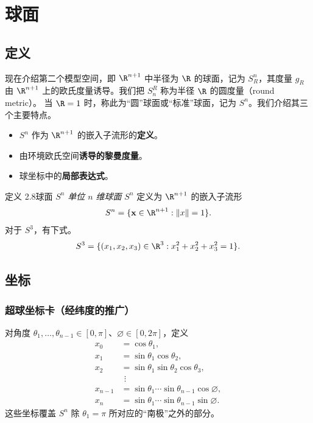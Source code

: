 \section{球面}
\subsection{定义}
现在介绍第二个模型空间，即 $\R^{n+1}$ 中半径为 $\R$ 的球面，记为 $S^n_R$，其度量 $g_R$ 由 $\R^{n+1}$ 上的欧氏度量诱导。我们把 $S_n^R$ 称为半径 $\R$ 的圆度量（round metric）。 当 $\R=1$ 时，称此为“圆”球面或“标准”球面，记为 $S^n$。我们介绍其三个主要特点。
\begin{itemize}
  \item $S^n$ 作为 $\R^{n+1}$ 的嵌入子流形的\textbf{定义}。
  \item 由环境欧氏空间\textbf{诱导的黎曼度量}。
  \item 球坐标中的\textbf{局部表达式}。
\end{itemize}

\begin{statement}{定义 2.8}{球面 $S^n$}
\emph{单位 $n$ 维球面} $S^n$ 定义为 $\R^{n+1}$ 的嵌入子流形
\[
  S^n=\{\mathbf x\in\R^{n+1}:\lVert x\rVert=1\}.
\]
对于 $S^3$，有下式。
\[
  S^3=\{(x_1,x_2,x_3)\in\R^3:x_1^2+x_2^2+x_3^2=1\}.
\]
\end{statement}

\subsection{坐标}
\subsubsection{超球坐标卡（经纬度的推广）}
对角度 $\theta_1,\ldots,\theta_{n-1}\in[0,\pi]$、$\varnothing\in[0,2\pi]$，定义
\[
  \begin{aligned}
    x_0&=\cos\theta_1,\\
    x_1&=\sin\theta_1\cos\theta_2,\\
    x_2&=\sin\theta_1\sin\theta_2\cos\theta_3,\\
    &\ \,\vdots\\
    x_{n-1}&=\sin\theta_1\cdots\sin\theta_{n-1}\cos\varnothing,\\
    x_n&=\sin\theta_1\cdots\sin\theta_{n-1}\sin\varnothing.
  \end{aligned}
\]
这些坐标覆盖 $S^n$ 除 $\theta_1=\pi$ 所对应的“南极”之外的部分。

